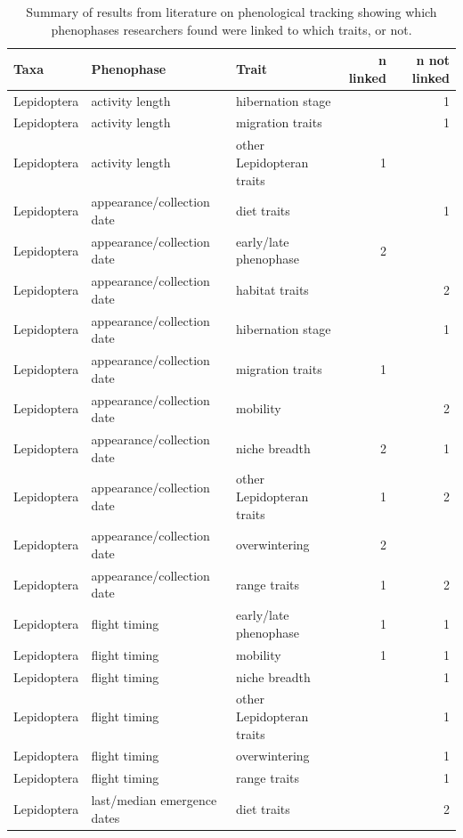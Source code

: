 \documentclass[11pt,letter]{article}
\begin{document}
\begin{table}[ht]
\centering
\caption{Summary of results from literature on phenological tracking showing which phenophases researchers found were linked to which traits, or not.} 
\label{tab:meta2}
\begingroup\footnotesize
\begin{tabular}{lllrr}
  \hline
Taxa & Phenophase & Trait & n linked & n not linked \\ 
  \hline
Lepidoptera & activity length & hibernation stage &  &   1 \\ 
  Lepidoptera & activity length & migration traits &  &   1 \\ 
  Lepidoptera & activity length & other Lepidopteran traits &   1 &  \\ 
  Lepidoptera & appearance/collection date & diet traits &  &   1 \\ 
  Lepidoptera & appearance/collection date & early/late phenophase &   2 &  \\ 
  Lepidoptera & appearance/collection date & habitat traits &  &   2 \\ 
  Lepidoptera & appearance/collection date & hibernation stage &  &   1 \\ 
  Lepidoptera & appearance/collection date & migration traits &   1 &  \\ 
  Lepidoptera & appearance/collection date & mobility &  &   2 \\ 
  Lepidoptera & appearance/collection date & niche breadth &   2 &   1 \\ 
  Lepidoptera & appearance/collection date & other Lepidopteran traits &   1 &   2 \\ 
  Lepidoptera & appearance/collection date & overwintering &   2 &  \\ 
  Lepidoptera & appearance/collection date & range traits &   1 &   2 \\ 
  Lepidoptera & flight timing & early/late phenophase &   1 &   1 \\ 
  Lepidoptera & flight timing & mobility &   1 &   1 \\ 
  Lepidoptera & flight timing & niche breadth &  &   1 \\ 
  Lepidoptera & flight timing & other Lepidopteran traits &  &   1 \\ 
  Lepidoptera & flight timing & overwintering &  &   1 \\ 
  Lepidoptera & flight timing & range traits &  &   1 \\ 
  Lepidoptera & last/median emergence dates & diet traits &  &   2 \\ 

\end{tabular}
\end{table}
\end{document}
